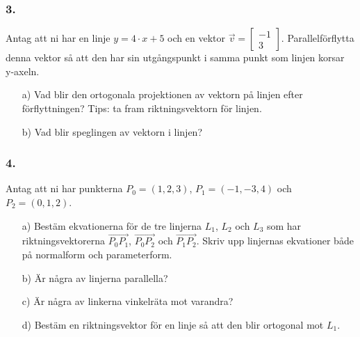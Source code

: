 \documentclass{article}
\begin{document}
\subsubsection*{3.}
Antag att ni har en linje $y = 4 \cdot x + 5$ och en vektor $\vec{v} = \begin{bmatrix} -1 \\ 3 \end{bmatrix}$. Parallelförflytta denna vektor så att den har sin utgångspunkt i samma punkt som linjen korsar y-axeln.
\begin{itemize}
\item[a) ] Vad blir den ortogonala projektionen av vektorn på linjen efter förflyttningen? Tips: ta fram riktningsvektorn för linjen. 
\item[b) ] Vad blir speglingen av vektorn i linjen?
\end{itemize}

\subsubsection*{4.}
Antag att ni har punkterna $P_0 = (1,2,3)$, $P_1 = (-1,-3,4)$ och $P_2 = (0,1,2)$.
\begin{itemize}
\item[a) ] Bestäm ekvationerna för de tre linjerna $L_1$, $L_2$ och $L_3$ som har riktningsvektorerna $\vec{P_0 P_1}$, $\vec{P_0 P_2}$ och $\vec{P_1 P_2}$. Skriv upp linjernas ekvationer både på normalform och parameterform. 
\item[b) ] Är några av linjerna parallella?
\item[c) ] Är några av linkerna vinkelräta mot varandra?
\item[d) ] Bestäm en riktningsvektor för en linje så att den blir ortogonal mot $L_1$. 
\end{itemize}
\end{document}
